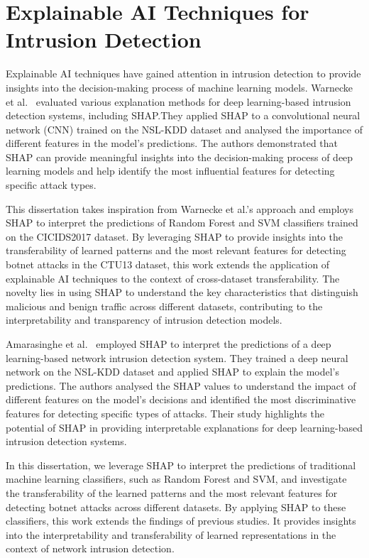 \section{Explainable AI Techniques for Intrusion Detection}\label{sec:ExplainableAITechniques}

Explainable AI techniques have gained attention in intrusion detection to provide insights into the decision-making process of machine learning models. Warnecke et al.~\cite{warnecke2020evaluating} evaluated various explanation methods for deep learning-based intrusion detection systems, including SHAP.\@ They applied SHAP to a convolutional neural network (CNN) trained on the NSL-KDD dataset and analysed the importance of different features in the model’s predictions. The authors demonstrated that SHAP can provide meaningful insights into the decision-making process of deep learning models and help identify the most influential features for detecting specific attack types.

This dissertation takes inspiration from Warnecke et al.’s approach and employs SHAP to interpret the predictions of Random Forest and SVM classifiers trained on the CICIDS2017 dataset. By leveraging SHAP to provide insights into the transferability of learned patterns and the most relevant features for detecting botnet attacks in the CTU13 dataset, this work extends the application of explainable AI techniques to the context of cross-dataset transferability. The novelty lies in using SHAP to understand the key characteristics that distinguish malicious and benign traffic across different datasets, contributing to the interpretability and transparency of intrusion detection models.

Amarasinghe et al.~\cite{amarasinghe2018toward} employed SHAP to interpret the predictions of a deep learning-based network intrusion detection system. They trained a deep neural network on the NSL-KDD dataset and applied SHAP to explain the model’s predictions. The authors analysed the SHAP values to understand the impact of different features on the model’s decisions and identified the most discriminative features for detecting specific types of attacks. Their study highlights the potential of SHAP in providing interpretable explanations for deep learning-based intrusion detection systems.

In this dissertation, we leverage SHAP to interpret the predictions of traditional machine learning classifiers, such as Random Forest and SVM, and investigate the transferability of the learned patterns and the most relevant features for detecting botnet attacks across different datasets. By applying SHAP to these classifiers, this work extends the findings of previous studies. It provides insights into the interpretability and transferability of learned representations in the context of network intrusion detection.

